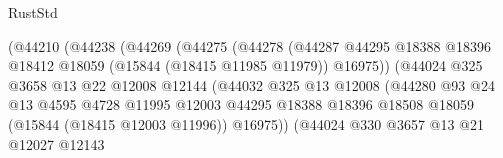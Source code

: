 \begin{lexlean}{RustStd}
\begin{coremodule}
                                      (@44210
                                        (@44238
                                          (@44269
                                            (@44275
                                              (@44278
                                                (@44287
                                                  @44295
                                                  @18388
                                                  @18396
                                                  @18412
                                                  @18059
                                                  (@15844 (@18415 @11985 @11979))
                                                  @16975))
                                              (@44024
                                                @325
                                                @3658
                                                @13
                                                @22
                                                @12008
                                                @12144
                                                (@44032
                                                  @325
                                                  @13
                                                  @12008
                                                  (@44280
                                                    @93
                                                    @24
                                                    @13
                                                    @4595
                                                    @4728
                                                    @11995
                                                    @12003
                                                    @44295
                                                    @18388
                                                    @18396
                                                    @18508
                                                    @18059
                                                    (@15844 (@18415 @12003 @11996))
                                                    @16975))
                                                (@44024
                                                  @330
                                                  @3657
                                                  @13
                                                  @21
                                                  @12027
                                                  @12143

\end{coremodule}
\end{lexlean}
